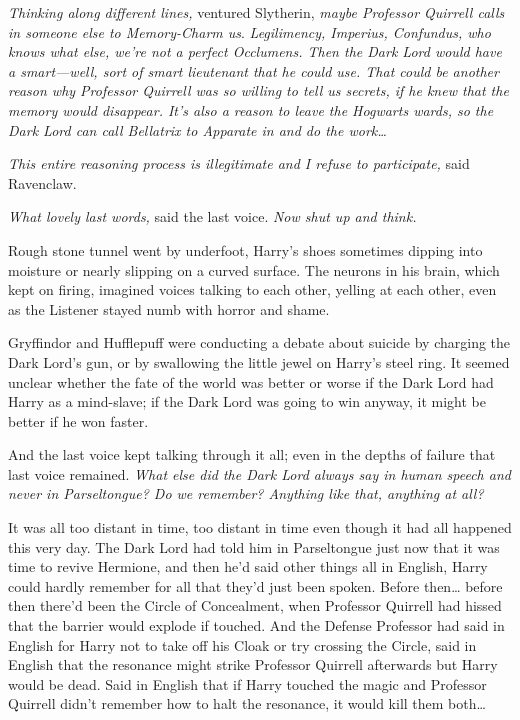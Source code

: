 \emph{Thinking along different lines,} ventured Slytherin, \emph{maybe Professor Quirrell calls in someone else to Memory-Charm us}. \emph{Legilimency, Imperius, Confundus, who knows what else, we're not a perfect Occlumens. Then the Dark Lord would have a smart—well, sort of smart lieutenant that he could use. That could be another reason why Professor Quirrell was so willing to tell us secrets, if he knew that the memory would disappear. It's also a reason to leave the Hogwarts wards, so the Dark Lord can call Bellatrix to Apparate in and do the work{\ldots}}

\emph{This entire reasoning process is illegitimate and I refuse to participate,} said Ravenclaw.

\emph{What lovely last words,} said the last voice. \emph{Now shut up and think.}

Rough stone tunnel went by underfoot, Harry's shoes sometimes dipping into moisture or nearly slipping on a curved surface. The neurons in his brain, which kept on firing, imagined voices talking to each other, yelling at each other, even as the Listener stayed numb with horror and shame.

Gryffindor and Hufflepuff were conducting a debate about suicide by charging the Dark Lord's gun, or by swallowing the little jewel on Harry's steel ring. It seemed unclear whether the fate of the world was better or worse if the Dark Lord had Harry as a mind-slave; if the Dark Lord was going to win anyway, it might be better if he won faster.

And the last voice kept talking through it all; even in the depths of failure that last voice remained. \emph{What else did the Dark Lord always say in human speech and never in Parseltongue? Do we remember? Anything like that, anything at all?}

It was all too distant in time, too distant in time even though it had all happened this very day. The Dark Lord had told him in Parseltongue just now that it was time to revive Hermione, and then he'd said other things all in English, Harry could hardly remember for all that they'd just been spoken. Before then{\ldots} before then there'd been the Circle of Concealment, when Professor Quirrell had hissed that the barrier would explode if touched. And the Defense Professor had said in English for Harry not to take off his Cloak or try crossing the Circle, said in English that the resonance might strike Professor Quirrell afterwards but Harry would be dead. Said in English that if Harry touched the magic and Professor Quirrell didn't remember how to halt the resonance, it would kill them both{\ldots}

